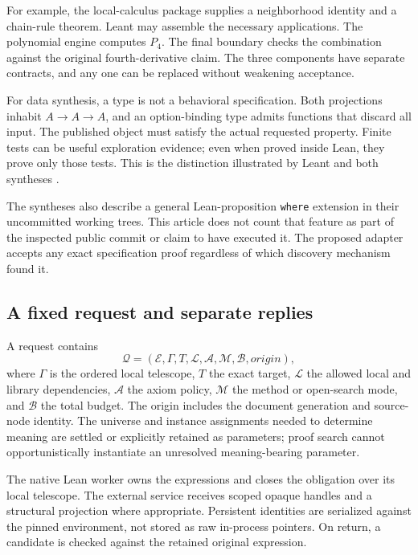 \documentclass[11pt,letterpaper]{article}
\newcommand{\code}[1]{\nolinkurl{#1}}
\newcommand{\E}{\mathcal E}
\numberwithin{equation}{section}
\begin{document}
For example, the local-calculus package supplies a neighborhood identity and a
chain-rule theorem. Leant may assemble the necessary applications. The polynomial
engine computes $P_4$. The final boundary checks the combination against the
original fourth-derivative claim. The three components have separate contracts,
and any one can be replaced without weakening acceptance.

For data synthesis, a type is not a behavioral specification. Both projections
inhabit $A\to A\to A$, and an option-binding type admits functions that discard
all input. The published object must satisfy the actual requested property.
Finite tests can be useful exploration evidence; even when proved inside Lean,
they prove only those tests. This is the distinction illustrated by Leant and
both syntheses \cite{synthesis,blueprints}.

The syntheses also describe a general Lean-proposition \code{where} extension
in their uncommitted working trees. This article does not count that feature as
part of the inspected public commit or claim to have executed it. The proposed
adapter accepts any exact specification proof regardless of which discovery
mechanism found it.

\subsection{A fixed request and separate replies}
A request contains
\[
 \mathcal Q=(\E,\Gamma,T,\mathcal L,\mathcal A,\mathcal M,
                 \mathcal B,\mathit{origin}),
\]
where $\Gamma$ is the ordered local telescope, $T$ the exact target,
$\mathcal L$ the allowed local and library dependencies, $\mathcal A$ the axiom
policy, $\mathcal M$ the method or open-search mode, and $\mathcal B$ the total
budget. The origin includes the document generation and source-node identity.
The universe and instance assignments needed to determine meaning are settled
or explicitly retained as parameters; proof search cannot opportunistically
instantiate an unresolved meaning-bearing parameter.

The native Lean worker owns the expressions and closes the obligation over its
local telescope. The external service receives scoped opaque handles and a
structural projection where appropriate. Persistent identities are serialized
against the pinned environment, not stored as raw in-process pointers. On return,
a candidate is checked against the retained original expression.
\end{document}
